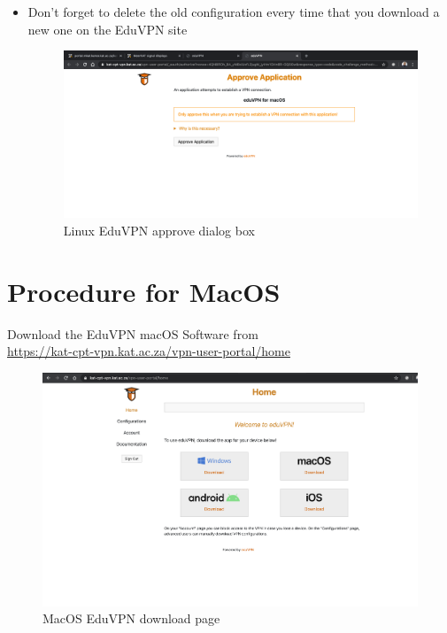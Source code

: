 \begin{itemize}
\item Don’t forget to delete the old configuration every time that you download a new one on the EduVPN site
\begin{figure}[!thb]
	\centering
	\includegraphics[scale=0.25]{Chapters/images/image26.png}
	
	\caption{Linux EduVPN approve dialog box }
	\label{fig:image26}
\end{figure}

\end{itemize}


\section{Procedure for MacOS}
Download the EduVPN macOS Software from\\ \url{https://kat-cpt-vpn.kat.ac.za/vpn-user-portal/home}

\begin{figure}[!thb]
	\centering
	\includegraphics[scale=0.23]{Chapters/images/image106.png}
	
	\caption{MacOS EduVPN download page }
	\label{fig:image106}
\end{figure}


